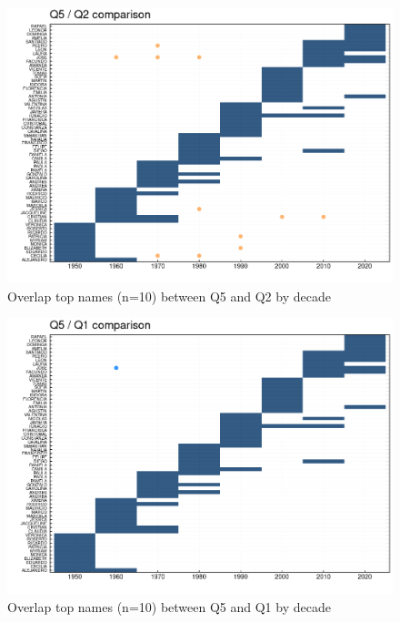 \begin{figure}[H]
\begin{center}
    \includegraphics[width=12cm]{plot/q5_q2_comparison.png}
    \caption{Overlap top names (n=10) between Q5 and Q2 by decade}
    \label{fig:new_names}
\end{center}
\end{figure}

\begin{figure}[H]
\begin{center}
    \includegraphics[width=12cm]{plot/q5_q1_comparison.png}
    \caption{Overlap top names (n=10) between Q5 and Q1 by decade}
    \label{fig:new_names}
\end{center}
\end{figure}



